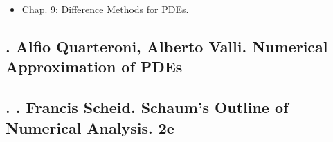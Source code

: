 \documentclass{article}
\newtheorem{theorem}{Theorem}
\begin{document}
\begin{itemize}
\begin{itemize}
		\begin{theorem}
			Let $\{u_i\}$ be the solution \eqref{general 1st order ODE: forward difference} \& $y(x)$ the solution of \eqref{general 1st order ODE} where $f(x,y)$ satisfies \eqref{Lipschitz condition} in the strip $S:[a\le x\le b,\ |y| < \infty]$. then, with the definitions of \eqref{local truncation error 1} of $\{\tau_i\}$:
			\begin{equation}
				|u_i - y(x_i)|\le e^{K(x_i - a)}\left(|e_0| + \frac{\tau}{K}\right),\ i = 0,1,\ldots,N,\mbox{ where } \tau\coloneqq\max_i |\tau_i|.
			\end{equation}
		\end{theorem}
		
	\end{itemize}
	\item {\sf Chap. 9: Difference Methods for PDEs.}
\end{itemize}


\subsection{\cite{Quarteroni_Valli1994}. {\sc Alfio Quarteroni, Alberto Valli}. Numerical Approximation of PDEs}


\subsection{\cite{Scheid1989}. \cite{Scheid1989}. {\sc Francis Scheid}. Schaum's Outline of Numerical Analysis. 2e}
\end{document}
